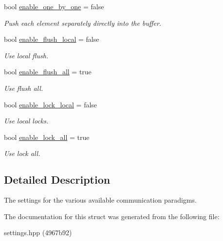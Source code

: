\begin{DoxyCompactItemize}
bool \hyperlink{structschwz_1_1Settings_1_1comm__settings_aae063b9fcf2bc8e49e960286e4c0939f}{enable\+\_\+one\+\_\+by\+\_\+one} = false
\begin{DoxyCompactList}\small\item\em Push each element separately directly into the buffer. \end{DoxyCompactList}\item 
\mbox{\label{structschwz_1_1Settings_1_1comm__settings_a5bea917e0dc11a5a671bd4d8cdb3e3cf}} 
bool \hyperlink{structschwz_1_1Settings_1_1comm__settings_a5bea917e0dc11a5a671bd4d8cdb3e3cf}{enable\+\_\+flush\+\_\+local} = false
\begin{DoxyCompactList}\small\item\em Use local flush. \end{DoxyCompactList}\item 
\mbox{\label{structschwz_1_1Settings_1_1comm__settings_a3eb62d22f79472020fce577ceddad916}} 
bool \hyperlink{structschwz_1_1Settings_1_1comm__settings_a3eb62d22f79472020fce577ceddad916}{enable\+\_\+flush\+\_\+all} = true
\begin{DoxyCompactList}\small\item\em Use flush all. \end{DoxyCompactList}\item 
\mbox{\label{structschwz_1_1Settings_1_1comm__settings_abc715396bf51f36307caf88db02c819c}} 
bool \hyperlink{structschwz_1_1Settings_1_1comm__settings_abc715396bf51f36307caf88db02c819c}{enable\+\_\+lock\+\_\+local} = false
\begin{DoxyCompactList}\small\item\em Use local locks. \end{DoxyCompactList}\item 
\mbox{\label{structschwz_1_1Settings_1_1comm__settings_a39a59cea325ea1b57aba12e9ada4b91b}} 
bool \hyperlink{structschwz_1_1Settings_1_1comm__settings_a39a59cea325ea1b57aba12e9ada4b91b}{enable\+\_\+lock\+\_\+all} = true
\begin{DoxyCompactList}\small\item\em Use lock all. \end{DoxyCompactList}\end{DoxyCompactItemize}


\subsection{Detailed Description}
The settings for the various available communication paradigms. 

The documentation for this struct was generated from the following file\+:\begin{DoxyCompactItemize}
\item 
settings.\+hpp (4967b92)\end{DoxyCompactItemize}
